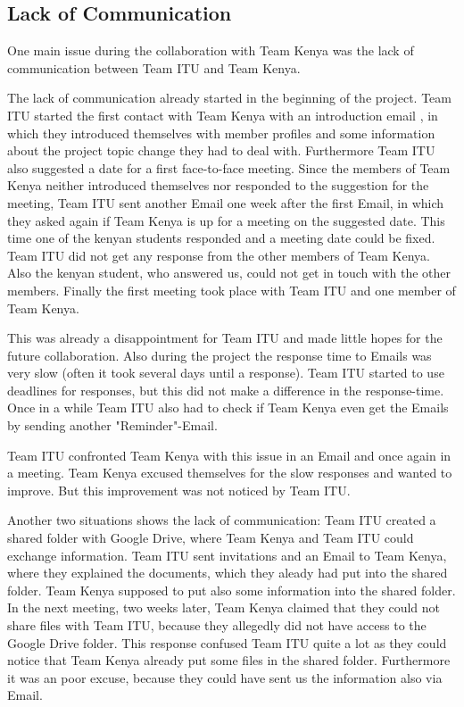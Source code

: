 \subsection{Lack of Communication}
One main issue during the collaboration with Team Kenya was the lack of communication between Team ITU and Team Kenya.

The lack of communication already started in the beginning of the project. Team ITU started the first contact with Team Kenya with an introduction email , in which they introduced themselves with member profiles and some information about the project topic change they had to deal with. Furthermore Team ITU also suggested a date for a first face-to-face meeting. Since the members of Team Kenya neither introduced themselves nor responded to the suggestion for the meeting, Team ITU sent another Email one week after the first Email, in which they asked again if Team Kenya is up for a meeting on the suggested date. This time one of the kenyan students responded and a meeting date could be fixed. Team ITU did not get any response from the other members of Team Kenya. Also the kenyan student, who answered us, could not get in touch with the other members. Finally the first meeting took place with Team ITU and one member of Team Kenya.

This was already a disappointment for Team ITU and made little hopes for the future collaboration. Also during the project the response time to Emails was very slow (often it took several days until a response). Team ITU started to use deadlines for responses, but this did not make a difference in the response-time. Once in a while Team ITU also had to check if Team Kenya even get the Emails by sending another "Reminder"-Email.

Team ITU confronted Team Kenya with this issue in an Email and once again in a meeting. Team Kenya excused themselves for the slow responses and wanted to improve. But this improvement was not noticed by Team ITU.

Another two situations shows the lack of communication:
Team ITU created a shared folder with Google Drive, where Team Kenya and Team ITU could exchange information. Team ITU sent invitations and an Email to Team Kenya, where they explained the documents, which they aleady had put into the shared folder. Team Kenya supposed to put also some information into the shared folder. In the next meeting, two weeks later, Team Kenya claimed that they could not share files with Team ITU, because they allegedly did not have access to the Google Drive folder. This response confused Team ITU quite a lot as they could notice that Team Kenya already put some files in the shared folder. Furthermore it was an poor excuse, because they could have sent us the information also via Email.

